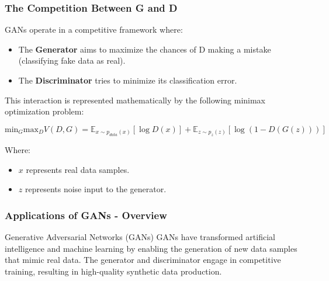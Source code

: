 \documentclass[aspectratio=169]{beamer}
\begin{document}
\begin{frame}[fragile]
    \frametitle{The Competition Between G and D}
    GANs operate in a competitive framework where:

    \begin{itemize}
        \item The \textbf{Generator} aims to maximize the chances of D making a mistake (classifying fake data as real).
        \item The \textbf{Discriminator} tries to minimize its classification error.
    \end{itemize}
    
    This interaction is represented mathematically by the following minimax optimization problem:

    \begin{equation}
        \text{min}_G \text{max}_D V(D, G) = \mathbb{E}_{x \sim p_{data}(x)}[\log D(x)] + \mathbb{E}_{z \sim p_z(z)}[\log(1 - D(G(z)))]
    \end{equation}
    
    Where:
    \begin{itemize}
        \item $x$ represents real data samples.
        \item $z$ represents noise input to the generator.
    \end{itemize}
\end{frame}

\begin{frame}[fragile]
    \frametitle{Applications of GANs - Overview}
    \begin{block}{Generative Adversarial Networks (GANs)}
        GANs have transformed artificial intelligence and machine learning by enabling the generation of new data samples that mimic real data. The generator and discriminator engage in competitive training, resulting in high-quality synthetic data production. 
    \end{block}
\end{frame}
\end{document}
